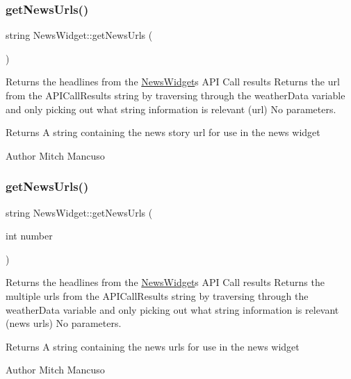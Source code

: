 \subsubsection{\texorpdfstring{get\+News\+Urls()}{getNewsUrls()}\hspace{0.1cm}{\footnotesize\ttfamily [1/2]}}
{\footnotesize\ttfamily string News\+Widget\+::get\+News\+Urls (\begin{DoxyParamCaption}{ }\end{DoxyParamCaption})}



Returns the headlines from the \mbox{\hyperlink{class_news_widget}{News\+Widget}}\textquotesingle{}s A\+PI Call results  Returns the url from the A\+P\+I\+Call\+Results string by traversing through the weather\+Data variable and only picking out what string information is relevant (url)  No parameters. 

\begin{DoxyReturn}{Returns}
A string containing the news story url for use in the news widget 
\end{DoxyReturn}
\begin{DoxyAuthor}{Author}
Mitch Mancuso 
\end{DoxyAuthor}
\mbox{\label{class_news_widget_a746993897e9d477e5b3ff225faca2ae1}} 
\subsubsection{\texorpdfstring{get\+News\+Urls()}{getNewsUrls()}\hspace{0.1cm}{\footnotesize\ttfamily [2/2]}}
{\footnotesize\ttfamily string News\+Widget\+::get\+News\+Urls (\begin{DoxyParamCaption}\item[{int}]{number }\end{DoxyParamCaption})}



Returns the headlines from the \mbox{\hyperlink{class_news_widget}{News\+Widget}}\textquotesingle{}s A\+PI Call results  Returns the multiple urls from the A\+P\+I\+Call\+Results string by traversing through the weather\+Data variable and only picking out what string information is relevant (news urls)  No parameters. 

\begin{DoxyReturn}{Returns}
A string containing the news urls for use in the news widget 
\end{DoxyReturn}
\begin{DoxyAuthor}{Author}
Mitch Mancuso 
\end{DoxyAuthor}
\mbox{\label{class_news_widget_a446535e974cd300e9952a083290cfc30}} 
